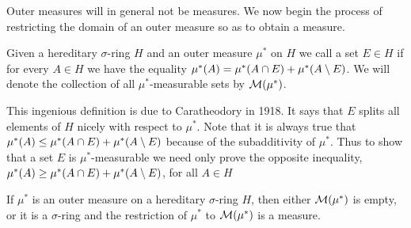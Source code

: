 Outer measures will in general not be measures. We now begin the process of restricting the domain of an outer measure so as to obtain a measure.

\begin{definition}
Given a hereditary $\sigma$-ring $H$ and an outer measure $\mu^*$ on $H$ we call a set $E\in H$  if for every $A\in H$ we have the equality $\mu^*(A)=\mu^*(A\cap E)+\mu^*(A\setminus E)$. We will denote the collection of all $\mu^*$-measurable sets by ${\cal M}(\mu^*)$.
\end{definition}

This ingenious definition is due to Caratheodory in 1918. It says that $E$ splits all elements of $H$ nicely with respect to $\mu^*$. Note that it is always true that $\mu^*(A) \leq \mu^*(A\cap E)+\mu^*(A\setminus E)$ because of the subadditivity of $\mu^*$. Thus to show that a set $E$ is $\mu^*$-measurable we need only prove the opposite inequality, $\mu^*(A)\geq\mu^*(A\cap E)+\mu^*(A\setminus E)$, for all $A\in H$

\begin{theorem}\label{thm:restriction of outer measure to meas sets}
If $\mu^*$ is an outer measure on a hereditary $\sigma$-ring $H$, then either ${\cal M}(\mu^*)$ is empty, or it is a $\sigma$-ring and the restriction of $\mu^*$ to ${\cal M}(\mu^*)$ is a measure.
\end{theorem}

